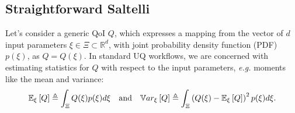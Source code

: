 \subsection{Straightforward Saltelli}
Let's consider a generic QoI $Q$, which expresses a mapping from the vector of $d$ input parameters $\xi \in \Xi \subset \mathbb{R}^d$, with joint probability density function (PDF) $p(\xi)$, as $Q = Q(\xi)$. In standard UQ workflows, we are concerned with estimating statistics for $Q$ with respect to the input parameters, \textit{e.g.} moments like the mean and variance:
\begin{equation}
\label{eq:UQmoments}
 \mathbb{E}_\xi\left[Q\right] \triangleq \int_\Xi Q(\xi) p(\xi) d\xi \quad \mathrm{and} \quad 
 \mathbb{V}ar_\xi\left[Q\right] \triangleq \int_\Xi \left( Q(\xi) - \mathbb{E}_\xi\left[Q\right] \right)^2 p(\xi) d\xi.
\end{equation}

